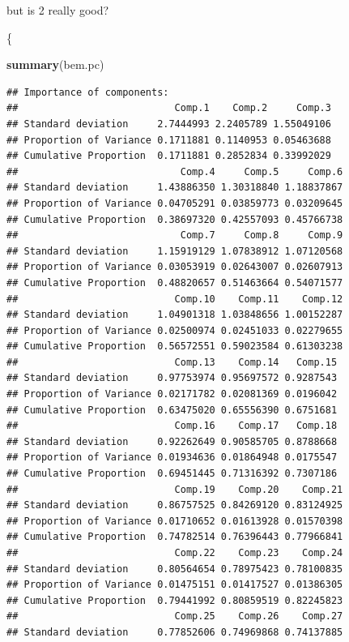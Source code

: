 \documentclass[ignorenonframetext,]{beamer}
\newenvironment{Shaded}{\begin{snugshade}}{\end{snugshade}}
\newcommand{\KeywordTok}[1]{\textcolor[rgb]{0.13,0.29,0.53}{\textbf{#1}}}
\newcommand{\NormalTok}[1]{#1}
\begin{document}
\begin{frame}[fragile]{but is 2 really good?}
\protect\hypertarget{but-is-2-really-good}{}

\{\scriptsize

\begin{Shaded}
\begin{Highlighting}[]
\KeywordTok{summary}\NormalTok{(bem.pc)}
\end{Highlighting}
\end{Shaded}

\begin{verbatim}
## Importance of components:
##                           Comp.1    Comp.2     Comp.3
## Standard deviation     2.7444993 2.2405789 1.55049106
## Proportion of Variance 0.1711881 0.1140953 0.05463688
## Cumulative Proportion  0.1711881 0.2852834 0.33992029
##                            Comp.4     Comp.5     Comp.6
## Standard deviation     1.43886350 1.30318840 1.18837867
## Proportion of Variance 0.04705291 0.03859773 0.03209645
## Cumulative Proportion  0.38697320 0.42557093 0.45766738
##                            Comp.7     Comp.8     Comp.9
## Standard deviation     1.15919129 1.07838912 1.07120568
## Proportion of Variance 0.03053919 0.02643007 0.02607913
## Cumulative Proportion  0.48820657 0.51463664 0.54071577
##                           Comp.10    Comp.11    Comp.12
## Standard deviation     1.04901318 1.03848656 1.00152287
## Proportion of Variance 0.02500974 0.02451033 0.02279655
## Cumulative Proportion  0.56572551 0.59023584 0.61303238
##                           Comp.13    Comp.14   Comp.15
## Standard deviation     0.97753974 0.95697572 0.9287543
## Proportion of Variance 0.02171782 0.02081369 0.0196042
## Cumulative Proportion  0.63475020 0.65556390 0.6751681
##                           Comp.16    Comp.17   Comp.18
## Standard deviation     0.92262649 0.90585705 0.8788668
## Proportion of Variance 0.01934636 0.01864948 0.0175547
## Cumulative Proportion  0.69451445 0.71316392 0.7307186
##                           Comp.19    Comp.20    Comp.21
## Standard deviation     0.86757525 0.84269120 0.83124925
## Proportion of Variance 0.01710652 0.01613928 0.01570398
## Cumulative Proportion  0.74782514 0.76396443 0.77966841
##                           Comp.22    Comp.23    Comp.24
## Standard deviation     0.80564654 0.78975423 0.78100835
## Proportion of Variance 0.01475151 0.01417527 0.01386305
## Cumulative Proportion  0.79441992 0.80859519 0.82245823
##                           Comp.25    Comp.26    Comp.27
## Standard deviation     0.77852606 0.74969868 0.74137885

\end{verbatim}
\end{frame}
\end{document}
